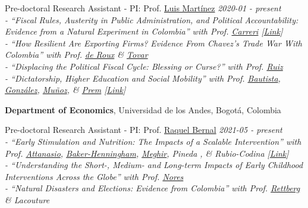 \documentclass[margin,line]{res}
\begin{document}
\begin{resume}
\vspace{-.2cm}
{Pre-doctoral Research Assistant - PI: Prof. \href{https://sites.google.com/site/lrmartineza}{Luis Martínez}  \hfill \emph{2020-01 - present}} \\
{\em \footnotesize - ``Fiscal Rules, Austerity in Public Administration, and Political Accountability: Evidence from a Natural Experiment in Colombia''  %
	with  Prof. \href{https://www.mariacarreri.com/}{Carreri} [\href{https://papers.ssrn.com/sol3/papers.cfm?abstract_id=3929550}{Link}]} 
\vspace{.15cm} \\
{\em \footnotesize  - ``How Resilient Are Exporting Firms? Evidence From Chavez's Trade War With Colombia'' 
	with Prof. \href{https://sites.google.com/site/nicoderoux/}{de Roux} \& \href{https://sites.google.com/view/jorgetovar/home}{Tovar}} 	
\vspace{.15cm} \\
{\em \footnotesize  - ``Displacing the Political Fiscal Cycle: Blessing or Curse?'' 
	with Prof. \href{https://sites.google.com/view/nruiz}{Ruiz}} 	
\vspace{.15cm} \\	
{\em \footnotesize  - ``Dictatorship, Higher Education and Social Mobility'' 
	with Prof. \href{https://harris.uchicago.edu/directory/maria-angelica-bautista}{Bautista}, %
			\href{https://fagonza4.github.io/}{González}, %
			\href{https://sites.google.com/view/pablomh}{Muñoz}, \& %
			\href{https://sites.google.com/site/fcomunozma}{Prem} [\href{https://papers.ssrn.com/sol3/papers.cfm?abstract_id=3597798}{Link}]}

\vspace{-.2cm}
	
{\bf Department of Economics}, Universidad de los Andes, Bogotá, Colombia

\vspace{-.2cm}
{Pre-doctoral Research Assistant - PI: Prof. \href{https://sites.google.com/view/raquelbernal}{Raquel Bernal}} \hfill \emph{2021-05 - present} \\
{\em \footnotesize - ``Early Stimulation and Nutrition: The Impacts of a Scalable Intervention''  %
	with  Prof. \href{https://economics.yale.edu/people/orazio-attanasio}{Attanasio},  %
	\href{https://research.bangor.ac.uk/portal/en/researchers/helen-henningham(ab5999a9-22af-4394-b4f4-89dff9971ad1).html}{Baker-Henningham}, %
	 \href{https://sites.google.com/yale.edu/costasmeghir/home}{Meghir}, %
	 Pineda , \& Rubio-Codina %
	[\href{https://academic.oup.com/jeea/article/20/4/1395/6516938?login=true}{Link}]} 
\vspace{.15cm} \\
{\em \footnotesize - ``Understanding the Short-, Medium- and Long-term Impacts of Early Childhood Interventions Across the Globe''  %
	with  Prof. \href{https://gse.rutgers.edu/faculty/milagros-nores/}{Nores}} 
\vspace{.15cm} \\
{\em \footnotesize - ``Natural Disasters and Elections: Evidence from Colombia''  %
	with  Prof. \href{https://cienciassociales.uniandes.edu.co/ciencia-politica/profesores/angelika-rettberg/}{Rettberg} \& Lacouture} 
\vspace{.15cm} 
	

\end{resume}
\end{document}
